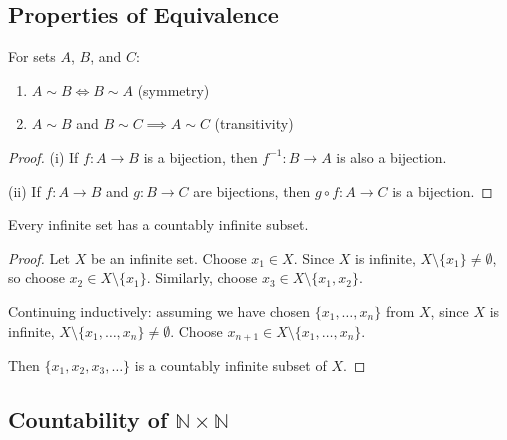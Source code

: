\documentclass[11pt]{report}
\begin{document}
\subsection{Properties of Equivalence}

\begin{thmbox}
For sets $A$, $B$, and $C$:
\begin{enumerate}[label=(\roman*)]
    \item $A \sim B \iff B \sim A$ (symmetry)
    \item $A \sim B$ and $B \sim C \implies A \sim C$ (transitivity)
\end{enumerate}
\end{thmbox}

\begin{proof}
(i) If $f: A \to B$ is a bijection, then $f^{-1}: B \to A$ is also a bijection.

(ii) If $f: A \to B$ and $g: B \to C$ are bijections, then $g \circ f: A \to C$ is a bijection.
\end{proof}

\begin{thmbox}
Every infinite set has a countably infinite subset.
\end{thmbox}

\begin{proof}
Let $X$ be an infinite set. Choose $x_1 \in X$. Since $X$ is infinite, $X \setminus \{x_1\} \neq \emptyset$, so choose $x_2 \in X \setminus \{x_1\}$. Similarly, choose $x_3 \in X \setminus \{x_1, x_2\}$.

Continuing inductively: assuming we have chosen $\{x_1, \ldots, x_n\}$ from $X$, since $X$ is infinite, $X \setminus \{x_1, \ldots, x_n\} \neq \emptyset$. Choose $x_{n+1} \in X \setminus \{x_1, \ldots, x_n\}$.

Then $\{x_1, x_2, x_3, \ldots\}$ is a countably infinite subset of $X$.
\end{proof}

\subsection{Countability of $\mathbb{N} \times \mathbb{N}$}
\end{document}

